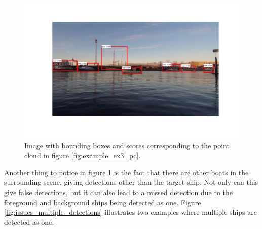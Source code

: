 \begin{figure}[H]
	\centering
	\includegraphics[width=\linewidth]{fig/example_1.png}
	\caption{Image with bounding boxes and scores corresponding to the point cloud in figure \ref{fig:example_ex3_pc}.}
	\label{fig:example_ex3_im}
\end{figure}
Another thing to notice in figure \ref{fig:example_ex3_im} is the fact that there are other boats in the surrounding scene, giving detections other than the target ship. Not only can this give false detections, but it can also lead to a missed detection due to the foreground and background ships being detected as one. Figure \ref{fig:issues_multiple_detections} illustrates two examples where multiple ships are detected as one. 

